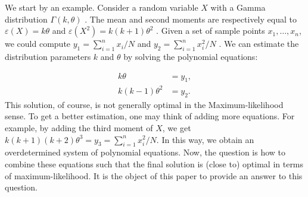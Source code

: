 We start by an example. Consider a random variable $X$ with a Gamma distribution $\Gamma(k,\theta)$  . The mean and second moments are respectively equal to $\varepsilon(X)=k\theta$  and $\varepsilon(X^2)=k(k+1)\theta^2$ . Given a set of sample points $x_1, …, x_n $, we could compute $y_1=\sum_{i=1}^nx_i/N$ and $y_2=\sum_{i=1}^n x_i^2/N$  . We can estimate the distribution parameters $k$ and $\theta$ by solving the polynomial equations:

\begin{align}
  \label{eq:poly_eq}
  k \theta  &= y_1,
  \\
  k (k-1) \theta^2 &= y_2.
\end{align}
This solution, of course, is not generally optimal in the Maximum-likelihood sense. To get a better estimation, one may think
of adding more equations. For example, by adding the third moment of $X$, we get $k (k+1) (k+2) \theta^3 = y_3 = \sum_{i=1}^n
x_i^2/N$. In this way, we obtain an overdetermined system of polynomial equations. Now, the question is how to combine these
equations such that the final solution is (close to) optimal in terms of maximum-likelihood. It is the object of this paper to
provide an answer to this question.

